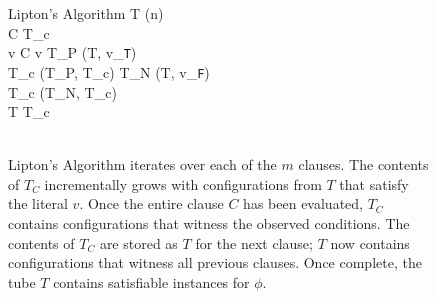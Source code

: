


\begin{figure}[htbp]
\begin{center}

	\begin{pseudocode}{Lipton's Algorithm}{\phi}
	T \GETS {}(n) \\
	\FOREACH {} C  \phi \DO
		\BEGIN
		T_c \GETS \emptyset \\
		\FOREACH {} v  C \DO
			\BEGIN
				\IF v  \THEN
					\BEGIN
						T_P \GETS {}(T, v_{\texttt{T}})\\
						T_c \GETS {}(T_P, T_c)						
					\END
				\ELSE
					\BEGIN
						T_N \GETS {}(T, v_{\texttt{F}})\\
						T_c \GETS {}(T_N, T_c)						
					\END
			\END
		\\
		T \GETS T_c\\
		\END
	\\
	\end{pseudocode}


\caption{{\sc Lipton's Algorithm} iterates over each of the $m$ clauses.  The contents of $T_C$ incrementally grows with configurations from $T$ that satisfy the literal $v$.  Once the entire clause $C$ has been evaluated, $T_C$ contains configurations that witness the observed conditions.  The contents of $T_C$ are stored as $T$ for the next clause; $T$ now contains configurations that witness all previous clauses.  Once complete, the tube $T$ contains satisfiable instances for $\phi$.}
\label{liptonAlgorithm}
\end{center}
\end{figure}

